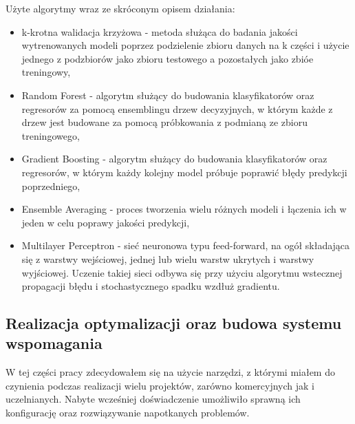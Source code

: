 Użyte algorytmy wraz ze skróconym opisem działania:
\begin{itemize}
    \item k-krotna walidacja krzyżowa \cite{crossvalidation} - metoda służąca do badania jakości wytrenowanych modeli poprzez podzielenie zbioru danych na k części i użycie jednego z podzbiorów jako zbioru testowego a pozostałych jako zbióe treningowy,
    \item Random Forest \cite{random_forest} - algorytm służący do budowania klasyfikatorów oraz regresorów  za pomocą ensemblingu drzew decyzyjnych, w którym każde z drzew jest budowane za pomocą próbkowania z podmianą ze zbioru treningowego,
    \item Gradient Boosting \cite{gradient_boosting} - algorytm służący do budowania klasyfikatorów oraz regresorów, w którym każdy kolejny model próbuje poprawić błędy predykcji poprzedniego,
    \item Ensemble Averaging \cite{ensemble_averaging} - proces tworzenia wielu różnych modeli i łączenia ich w jeden w celu poprawy jakości predykcji,
    \item Multilayer Perceptron \cite{negnevitsky2005artificial} - sieć neuronowa typu feed-forward, na ogół składająca się z warstwy wejściowej, jednej lub wielu warstw ukrytych i warstwy wyjściowej. Uczenie takiej sieci odbywa się przy użyciu algorytmu wstecznej propagacji błędu i stochastycznego spadku wzdłuż gradientu.
\end{itemize}

\subsection{Realizacja optymalizacji oraz budowa systemu wspomagania}
W tej części pracy zdecydowałem się na użycie narzędzi, z którymi miałem do czynienia podczas realizacji wielu projektów, zarówno komercyjnych jak i uczelnianych. Nabyte wcześniej doświadczenie umożliwiło sprawną ich konfigurację oraz rozwiązywanie napotkanych problemów.


